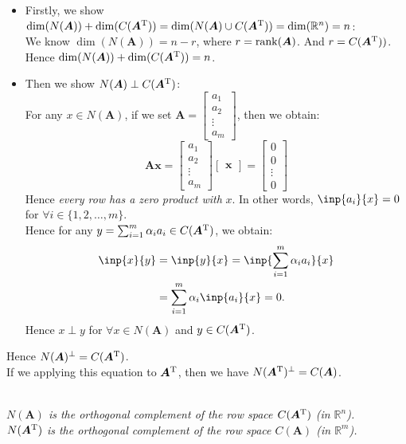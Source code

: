 \begin{itemize}
\item
Firstly, we show $\dim(N(\bm A))+\dim(C(\bm A^{\mathrm T}))=\dim(N(\bm A)\cup C(\bm A^{\mathrm T}))=\dim(\mathbb{R}^{n})=n$:\\
We know $\dim(N(\bm A))=n-r$, where $r=\operatorname{rank}(\bm A)$. And $r=C(\bm A^{\mathrm T}))$.\\ Hence $\dim(N(\bm A))+\dim(C(\bm A^{\mathrm T}))=n$.
\item
Then we show $N(\bm A)\perp C(\bm A^{\mathrm T})$:\\
For any $x\in N(\bm A)$, if we set $\bm A=\begin{bmatrix}
a_1\\a_2\\\vdots\\a_m
\end{bmatrix}$, then we obtain:
\[
\bm{Ax}=\begin{bmatrix}
a_1\\a_2\\\vdots\\a_m
\end{bmatrix}\begin{bmatrix}
\bm x
\end{bmatrix}=\begin{bmatrix}
0\\0\\\vdots\\0
\end{bmatrix}
\]
Hence \textit{every row has a zero product with} $x$. In other words, $\inp{a_i}{x}=0$ for $\forall i\in\{1,2,\dots,m\}$.\\
Hence for any $y=\sum_{i=1}^m\alpha_ia_i\in C(\bm A^{\mathrm T})$, we obtain:
\[
\begin{aligned}
\inp{x}{y}&=\inp{y}{x}=\inp{\sum_{i=1}^m\alpha_ia_i}{x}\\
&=\sum_{i=1}^{m}\alpha_i\inp{a_i}{x}=0.
\end{aligned}
\]
Hence $x\perp y$ for $\forall x\in N(\bm A)$ and $y\in C(\bm A^{\mathrm T})$.\\
\end{itemize}
Hence $N(\bm A)^{\perp}=C(\bm A^{\mathrm T})$.\\
If we applying this equation to $\bm A^{\mathrm T}$, then we have $N(\bm A^{\mathrm T})^{\perp}=C(\bm A)$. 
\enlargethispage{1cm}
\begin{theorem}\qquad\\
\emph{$N(\bm A)$ is the orthogonal complement of the row space $C(\bm A^{\mathrm T})$ (in $\mathbb{R}^{n}$).}\\
\emph{$N(\bm A^{\mathrm T})$ is the orthogonal complement of the row space $C(\bm A)$ (in $\mathbb{R}^{m}$).}
\end{theorem}

